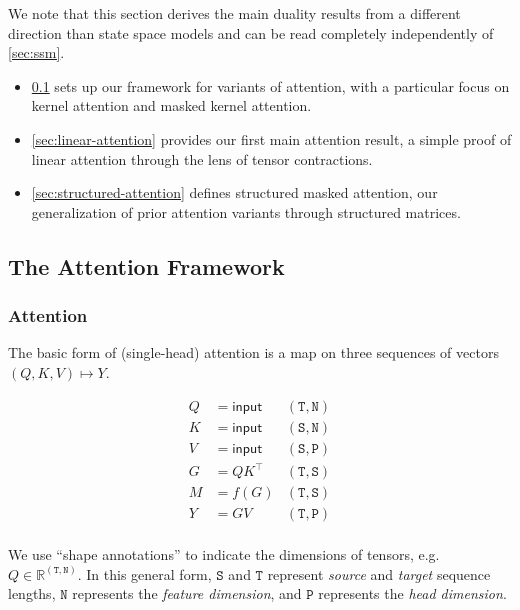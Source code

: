 We note that this section derives the main duality results from a different direction than state space models and can be read completely independently of \ref{sec:ssm}.

\begin{itemize}
  \item \ref{sec:masked-attention} sets up our framework for variants of attention, with a particular focus on kernel attention and masked kernel attention.
  \item \ref{sec:linear-attention} provides our first main attention result, a simple proof of linear attention through the lens of tensor contractions.
  \item \ref{sec:structured-attention} defines structured masked attention, our generalization of prior attention variants through structured matrices.
\end{itemize}

\subsection{The Attention Framework}
\label{sec:masked-attention}

\subsubsection{Attention}
The basic form of (single-head) attention is a map on three sequences of vectors $(Q, K, V) \mapsto Y$.

\begin{equation}
  \label{eq:kernel-attention}
  \begin{aligned}
    Q &= \mathsf{input} & \mathtt{(T,N)} \\
    K &= \mathsf{input} & \mathtt{(S,N)} \\
    V &= \mathsf{input} & \mathtt{(S,P)} \\
    G &= QK^\top        & \mathtt{(T,S)} \\
    M &= f(G)           & \mathtt{(T,S)} \\
    Y &= GV             & \mathtt{(T,P)} \\
  \end{aligned}
\end{equation}

We use ``shape annotations'' to indicate the dimensions of tensors, e.g.\ $Q \in \mathbb{R}^{\mathtt{(T,N)}}$.
In this general form, $\mathtt{S}$ and $\mathtt{T}$ represent \emph{source} and \emph{target} sequence lengths,
$\mathtt{N}$ represents the \emph{feature dimension}, and $\mathtt{P}$ represents the \emph{head dimension}.

